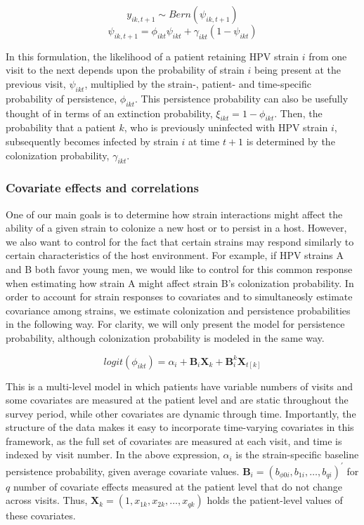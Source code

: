 \documentclass{article}
\begin{document}
$$y_{ik,t+1} \sim Bern(\psi_{ik,t+1})$$
$$\psi_{ik,t+1} = \phi_{ikt}\psi_{ikt} + \gamma_{ikt}(1-\psi_{ikt})$$

In this formulation, the likelihood of a patient retaining HPV strain $i$ from one visit to the next depends upon the probability of strain $i$ being present at the previous visit, $\psi_{ikt}$, multiplied by the strain-, patient- and time-specific probability of persistence, $\phi_{ikt}$. This persistence probability can also be usefully thought of in terms of an extinction probability, $\xi_{ikt} = 1 - \phi_{ikt}$. Then, the probability that a patient $k$, who is previously uninfected with HPV strain $i$, subsequently becomes infected by strain $i$ at time $t+1$ is determined by the colonization probability, $\gamma_{ikt}$.

\subsubsection*{Covariate effects and correlations}

One of our main goals is to determine how strain interactions might affect the ability of a given strain to colonize a new host or to persist in a host. However, we also want to control for the fact that certain strains may respond similarly to certain characteristics of the host environment. For example, if HPV strains A and B both favor young men, we would like to control for this common response when estimating how strain A might affect strain B's colonization probability. In order to account for strain responses to covariates and to simultaneosly estimate covariance among strains, we estimate colonization and persistence probabilities in the following way. For clarity, we will only present the model for persistence probability, although colonization probability is modeled in the same way. 

$$ logit(\phi_{ikt}) = \alpha_i + \textbf{B}_{i}\textbf{X}_{k} + \textbf{B}^{k}_{i}\textbf{X}_{t[k]} $$

This is a multi-level model in which patients have variable numbers of visits and some covariates are measured at the patient level and are static throughout the survey period, while other covariates are dynamic through time. Importantly, the structure of the data makes it easy to incorporate time-varying covariates in this framework, as the full set of covariates are measured at each visit, and time is indexed by visit number. In the above expression, $\alpha_i$ is the strain-specific baseline persistence probability, given average covariate values. $ \textbf{B}_{i} = (b_{\phi0i}, b_{1i}, \dots, b_{qi})^{'} $ for $q$ number of covariate effects measured at the patient level that do not change across visits. Thus, $ \textbf{X}_{k} = (1, x_{1k}, x_{2k}, \dots, x_{qk}) $ holds the patient-level values of these covariates. 
\end{document}
